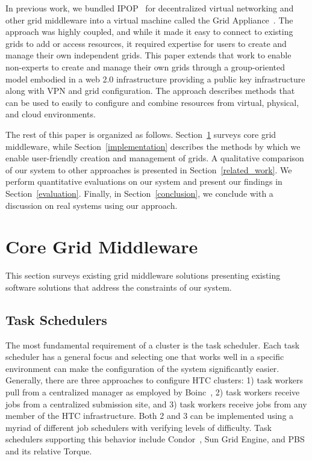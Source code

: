 \documentclass{sig-alternate}
\begin{document}
In previous work, we bundled IPOP~\cite{ipop} for decentralized virtual
networking and other grid middleware into a virtual machine called the
Grid Appliance~\cite{grid_appliance}.  The approach was highly coupled, and
while it made it easy to connect to existing grids to add or access resources,
it required expertise for users to create and manage their own independent
grids.  This paper extends that work to enable non-experts to create and manage
their own grids through a group-oriented model embodied in a web 2.0
infrastructure providing a public key infrastructure along with VPN and grid
configuration.  The approach describes methods that can be used to easily
to configure and combine resources from virtual, physical, and cloud
environments.

The rest of this paper is organized as follows.  Section~\ref{middleware}
surveys core grid middleware, while Section~\ref{implementation} describes
the methods by which we enable user-friendly creation and management of grids.
A qualitative comparison of our system to other approaches is presented in
Section~\ref{related_work}.  We perform quantitative evaluations on our system
and present our findings in Section~\ref{evaluation}.  Finally, in
Section~\ref{conclusion}, we conclude with a discussion on real systems using
our approach.

\section{Core Grid Middleware}
\label{middleware}
This section surveys existing grid middleware solutions presenting existing
software solutions that address the constraints of our system.

\subsection{Task Schedulers}
The most fundamental requirement of a cluster is the task scheduler.  Each
task scheduler has a general focus and selecting one that works well in a
specific environment can make the configuration of the system significantly
easier.  Generally, there are three approaches to configure HTC clusters: 1)
task workers pull from a centralized manager as employed by Boinc~\cite{boinc},
2) task workers receive jobs from a centralized submission site, and 3) task
workers receive jobs from any member of the HTC infrastructure.  Both 2 and 3
can be implemented using a myriad of different job schedulers with verifying
levels of difficulty.  Task schedulers supporting this behavior include
Condor~\cite{condor0}, Sun Grid Engine, and PBS and its relative Torque.
\end{document}
